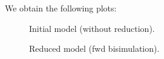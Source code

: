 \documentclass[11pt]{book}
\begin{document}
We obtain the following plots:
\begin{figure}[htp]
\centering  \begin{minipage}{0.35\linewidth}
\end{minipage}
\caption{Initial model (without reduction).}
\end{figure}

\begin{figure}[htp]
\centering\begin{minipage}{0.35\linewidth}
\end{minipage}
\caption{Reduced model (fwd bisimulation).}
\end{figure}
\end{document}
